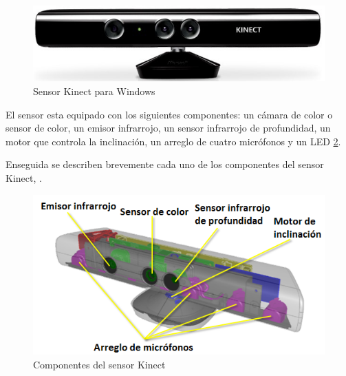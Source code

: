 \begin{figure}[h!]
\begin{center}
\includegraphics[scale=.60]{./Figures/Kinect.jpg}
\end{center}
\caption{Sensor Kinect para Windows}
\label{fig:KinectPic}
\end{figure} 

El sensor esta equipado con los siguientes componentes: un cámara de color o sensor de color, un emisor infrarrojo, un sensor infrarrojo de profundidad, un motor que controla la inclinación, un arreglo de cuatro micrófonos y un LED \ref{fig:KinectComponentes}. 

Enseguida se describen brevemente cada uno de los componentes del sensor Kinect, \citep{Jana2013}. 
\begin{figure}[h!]
\begin{center}
\includegraphics[scale=.6]{./Figures/sensor.png}
\end{center}
\caption{Componentes del sensor Kinect}
\label{fig:KinectComponentes}
\end{figure}   


